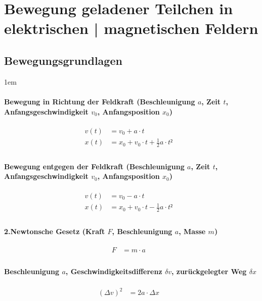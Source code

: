 \section{Bewegung geladener Teilchen in elektrischen | magnetischen Feldern}

\subsection{Bewegungsgrundlagen}

\leftskip1em
\paragraph{Bewegung in Richtung der Feldkraft (Beschleunigung $a$, Zeit $t$,
Anfangsgeschwindigkeit $v_0$, Anfangsposition $x_0$)}
\begin{align*}
  v(t) &= v_0 + a \cdot t &\\
  x(t) &= x_0 + v_0 \cdot t + \frac{1}{2}a \cdot t² &\\
\end{align*}

\paragraph{Bewegung entgegen der Feldkraft (Beschleunigung $a$, Zeit $t$,
Anfangsgeschwindigkeit $v_0$, Anfangsposition $x_0$)}
\begin{align*}
  v(t) &= v_0 - a \cdot t &\\
  x(t) &= x_0 + v_0 \cdot t - \frac{1}{2}a \cdot t² &\\
\end{align*}

\paragraph{2.Newtonsche Gesetz (Kraft $F$, Beschleunigung $a$, Masse $m$)}
\begin{align*}
  F &= m \cdot a &\\
\end{align*}

\paragraph{Beschleunigung $a$, Geschwindigkeitsdifferenz $\delta v$, zurückgelegter Weg $\delta x$}
\begin{align*}
  \left( \Delta v \right) ^2 &= 2a \cdot \Delta x &\\
\end{align*}

